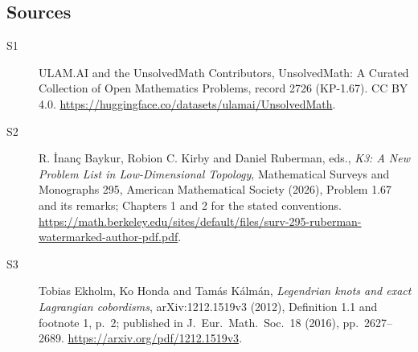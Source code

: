 \documentclass[11pt]{article}
\begin{document}
\subsection{Sources}
\begin{description}
\item[\hypertarget{source:2726:1}{S1}] ULAM.AI and the UnsolvedMath Contributors, UnsolvedMath: A Curated Collection of Open Mathematics Problems, record 2726 (KP-1.67). CC BY 4.0. \url{https://huggingface.co/datasets/ulamai/UnsolvedMath}.
\item[\hypertarget{source:2726:2}{S2}] R. İnanç Baykur, Robion C. Kirby and Daniel Ruberman, eds., \emph{K3: A New Problem List in Low-Dimensional Topology}, Mathematical Surveys and Monographs 295, American Mathematical Society (2026), Problem 1.67 and its remarks; Chapters 1 and 2 for the stated conventions. \url{https://math.berkeley.edu/sites/default/files/surv-295-ruberman-watermarked-author-pdf.pdf}.
\item[\hypertarget{source:2726:3}{S3}] Tobias Ekholm, Ko Honda and Tamás Kálmán, \emph{Legendrian knots and exact Lagrangian cobordisms}, arXiv:1212.1519v3 (2012), Definition 1.1 and footnote 1, p.\ 2; published in J.\ Eur.\ Math.\ Soc.\ 18 (2016), pp.\ 2627--2689. \url{https://arxiv.org/pdf/1212.1519v3}.
\end{description}
\label{end:2726}
\end{document}
